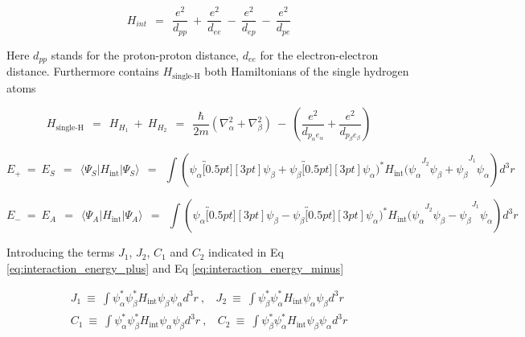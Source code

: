 \documentclass[10pt]{report}
\numberwithin{equation}{chapter}
\newcommand{\refEq}[1]{
  Eq  \ref{#1}
}
\begin{document}
\begin{equation}
  H_{int} ~~=~~ \frac{e^2}{d_{pp}} ~+~ \frac{e^2}{d_{ee}} ~-~ \frac{e^2}{d_{ep}} ~-~ \frac{e^2}{d_{pe}}
\end{equation}

Here $d_{pp}$ stands for the proton-proton distance, $d_{ee}$ for the electron-electron distance.
Furthermore contains $H_\text{single-H}$ both Hamiltonians of the single hydrogen atoms

\begin{equation}
  H_\text{single-H} ~~=~~ H_{H_1} ~+~ H_{H_2} ~~=~~ 
  \frac{\hbar}{2m} \left( \nabla^2_\alpha + \nabla^2_\beta \right) ~-~ 
  \left(\frac{e^2}{d_{p_\alpha e_\alpha}} + \frac{e^2}{d_{p_\beta e_\beta}} \right)
\end{equation}


\begin{equation} \label{eq:interaction_energy_plus}
  E_+ ~=~E_S ~~=~~ \langle \Psi_S | H_\text{int} | \Psi_S \rangle ~~=~~
  \int ( \psi_\alpha \overbracket[0.5pt][3pt]{ \psi_\beta + \psi_\beta \overbracket[0.5pt][3pt]{ \psi_\alpha )^* H_\text{int} 
  ( \psi_\alpha }^{J_2} \psi_\beta + \psi_\beta}^{J_1}  \psi_\alpha ) d^3r
\end{equation}



\begin{equation} \label{eq:interaction_energy_minus}
  E_- ~=~E_A ~~=~~ \langle \Psi_A | H_\text{int} | \Psi_A \rangle ~~=~~
  \int ( \psi_\alpha \overbracket[0.5pt][3pt]{ \psi_\beta - \psi_\beta \overbracket[0.5pt][3pt]{ \psi_\alpha )^* H_\text{int} 
  ( \psi_\alpha }^{J_2} \psi_\beta - \psi_\beta}^{J_1} \psi_\alpha ) d^3r
\end{equation}


Introducing the terms $J_1$, $J_2$, $C_1$ and $C_2$ indicated in \refEq{eq:interaction_energy_plus} and \refEq{eq:interaction_energy_minus}

\begin{align}
  J_1 ~\equiv~ \int \psi_\alpha^* \psi_\beta^* H_\text{int} \psi_\beta \psi_\alpha d^3r ~,~~~~
  J_2 ~\equiv~ \int \psi_\beta^* \psi_\alpha^* H_\text{int} \psi_\alpha \psi_\beta d^3r \\
  C_1 ~\equiv~ \int \psi_\alpha^* \psi_\beta^* H_\text{int} \psi_\alpha \psi_\beta d^3r ~,~~~~
  C_2 ~\equiv~ \int \psi_\beta^* \psi_\alpha^* H_\text{int} \psi_\beta \psi_\alpha d^3r
\end{align}
\end{document}

